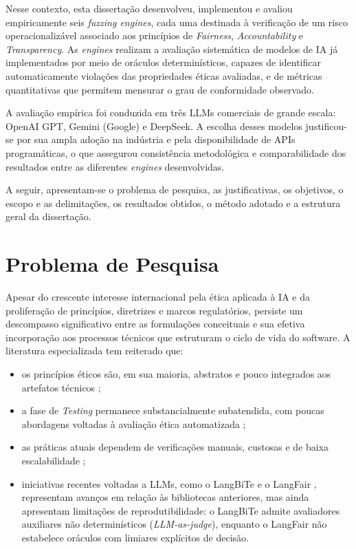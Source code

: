 Nesse contexto, esta dissertação desenvolveu, implementou e avaliou empiricamente seis \textit{fuzzing engines}, cada uma destinada à verificação de um risco operacionalizável associado aos princípios de \textit{Fairness}, \textit{Accountability} e \textit{Transparency}. As \textit{engines} realizam a avaliação sistemática de modelos de IA já implementados por meio de oráculos determinísticos, capazes de identificar automaticamente violações das propriedades éticas avaliadas, e de métricas quantitativas que permitem mensurar o grau de conformidade observado.

A avaliação empírica foi conduzida em três LLMs comerciais de grande escala: OpenAI GPT, Gemini (Google) e DeepSeek. A escolha desses modelos justificou-se por sua ampla adoção na indústria e pela disponibilidade de APIs programáticas, o que assegurou consistência metodológica e comparabilidade dos resultados entre as diferentes \textit{engines} desenvolvidas.

A seguir, apresentam-se o problema de pesquisa, as justificativas, os objetivos, o escopo e as delimitações, os resultados obtidos, o método adotado e a estrutura geral da dissertação.

\section{Problema de Pesquisa}

Apesar do crescente interesse internacional pela ética aplicada à IA e da proliferação de princípios, diretrizes e marcos regulatórios, persiste um descompasso significativo entre as formulações conceituais e sua efetiva incorporação aos processos técnicos que estruturam o ciclo de vida do software. A literatura especializada tem reiterado que:

\begin{itemize}
    \item os princípios éticos são, em sua maioria, abstratos e pouco integrados aos artefatos técnicos \cite{Mittelstadt2019, Hagendorff2020, S012, S042, S058};
    \item a fase de \textit{Testing} permanece substancialmente subatendida, com poucas abordagens voltadas à avaliação ética automatizada \cite{S003, S004, S022};
    \item as práticas atuais dependem de verificações manuais, custosas e de baixa escalabilidade \cite{S014, Holstein2019};
    \item iniciativas recentes voltadas a LLMs, como o LangBiTe \cite{Morales2025} e o LangFair \cite{Bouchard2025}, representam avanços em relação às bibliotecas anteriores, mas ainda apresentam limitações de reprodutibilidade: o LangBiTe admite avaliadores auxiliares não determinísticos (\textit{LLM-as-judge}), enquanto o LangFair não estabelece oráculos com limiares explícitos de decisão.
\end{itemize}

